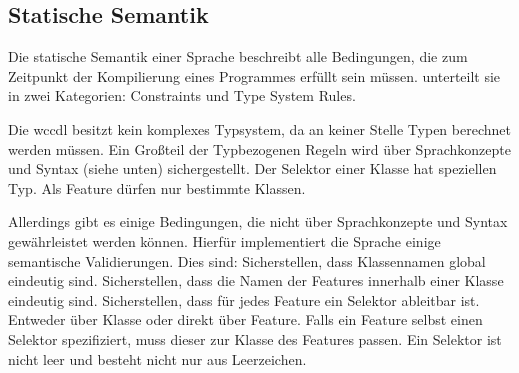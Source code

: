\subsection{Statische Semantik}
    Die statische Semantik einer Sprache beschreibt alle Bedingungen,
    die zum Zeitpunkt der Kompilierung eines Programmes erfüllt sein müssen.
    \citet[Kapitel 4.3]{voelter:DslEngineering} unterteilt sie in zwei Kategorien:
    Constraints und Type System Rules.

    Die \gls{wccdl} besitzt kein komplexes Typsystem,
    da an keiner Stelle Typen berechnet werden müssen.
    Ein Großteil der Typbezogenen Regeln wird über Sprachkonzepte und Syntax (siehe unten)
    sichergestellt.
    Der Selektor einer Klasse hat speziellen Typ.
    Als Feature dürfen nur bestimmte Klassen.

    Allerdings gibt es einige Bedingungen, die nicht über Sprachkonzepte und Syntax gewährleistet werden können.
    Hierfür implementiert die Sprache einige semantische Validierungen.
    Dies sind:
    Sicherstellen, dass Klassennamen global eindeutig sind.
    Sicherstellen, dass die Namen der Features innerhalb einer Klasse eindeutig sind.
    Sicherstellen, dass für jedes Feature ein Selektor ableitbar ist. Entweder über Klasse oder direkt über Feature.
    Falls ein Feature selbst einen Selektor spezifiziert, muss dieser zur Klasse des Features passen.
    Ein Selektor ist nicht leer und besteht nicht nur aus Leerzeichen.